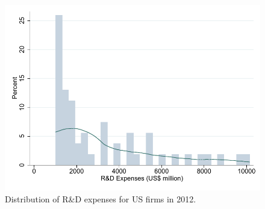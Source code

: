 \begin{figure}[htbp]
\centering
\includegraphics{figures/histogram_rd.pdf}
\caption{Distribution of R\&D expenses for US firms in 2012.}
\label{fig:fig1}
\end{figure}